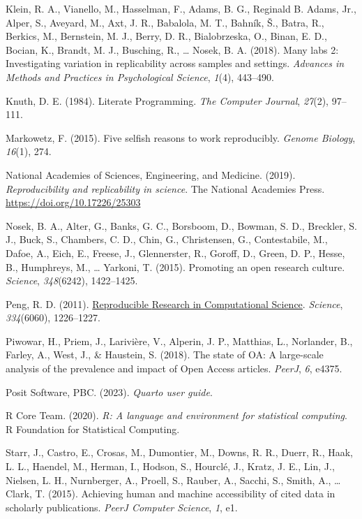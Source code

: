 \documentclass[
  a4paper,
]{article}
\newlength{\cslhangindent}
\newenvironment{CSLReferences}[2] %
 {\begin{list}{}{%
  \setlength{\itemindent}{0pt}
  \setlength{\leftmargin}{0pt}
  \setlength{\parsep}{0pt}
  \ifodd #1
   \setlength{\leftmargin}{\cslhangindent}
   \setlength{\itemindent}{-1\cslhangindent}
  \fi
  \setlength{\itemsep}{#2\baselineskip}}}
 {\end{list}}
\begin{document}
\begin{CSLReferences}{1}{0}
Klein, R. A., Vianello, M., Hasselman, F., Adams, B. G., Reginald B.
Adams, Jr., Alper, S., Aveyard, M., Axt, J. R., Babalola, M. T., Bahník,
Š., Batra, R., Berkics, M., Bernstein, M. J., Berry, D. R.,
Bialobrzeska, O., Binan, E. D., Bocian, K., Brandt, M. J., Busching, R.,
\ldots{} Nosek, B. A. (2018). Many labs 2: {Investigating} variation in
replicability across samples and settings. \emph{Advances in Methods and
Practices in Psychological Science}, \emph{1}(4), 443--490.

Knuth, D. E. (1984). Literate {Programming}. \emph{The Computer
Journal}, \emph{27}(2), 97--111.

Markowetz, F. (2015). Five selfish reasons to work reproducibly.
\emph{Genome Biology}, \emph{16}(1), 274.

National Academies of Sciences, Engineering, and Medicine. (2019).
\emph{Reproducibility and replicability in science}. The National
Academies Press. \url{https://doi.org/10.17226/25303}

Nosek, B. A., Alter, G., Banks, G. C., Borsboom, D., Bowman, S. D.,
Breckler, S. J., Buck, S., Chambers, C. D., Chin, G., Christensen, G.,
Contestabile, M., Dafoe, A., Eich, E., Freese, J., Glennerster, R.,
Goroff, D., Green, D. P., Hesse, B., Humphreys, M., \ldots{} Yarkoni, T.
(2015). Promoting an open research culture. \emph{Science},
\emph{348}(6242), 1422--1425.

Peng, R. D. (2011).
\href{https://www.ncbi.nlm.nih.gov/pubmed/22144613}{Reproducible
{Research} in {Computational Science}}. \emph{Science},
\emph{334}(6060), 1226--1227.

Piwowar, H., Priem, J., Larivière, V., Alperin, J. P., Matthias, L.,
Norlander, B., Farley, A., West, J., \& Haustein, S. (2018). The state
of {OA}: A large-scale analysis of the prevalence and impact of {Open
Access} articles. \emph{PeerJ}, \emph{6}, e4375.

Posit Software, PBC. (2023). \emph{Quarto user guide}.

R Core Team. (2020). \emph{R: {A} language and environment for
statistical computing}. R Foundation for Statistical Computing.

Starr, J., Castro, E., Crosas, M., Dumontier, M., Downs, R. R., Duerr,
R., Haak, L. L., Haendel, M., Herman, I., Hodson, S., Hourclé, J.,
Kratz, J. E., Lin, J., Nielsen, L. H., Nurnberger, A., Proell, S.,
Rauber, A., Sacchi, S., Smith, A., \ldots{} Clark, T. (2015). Achieving
human and machine accessibility of cited data in scholarly publications.
\emph{PeerJ Computer Science}, \emph{1}, e1.


\end{CSLReferences}
\end{document}
